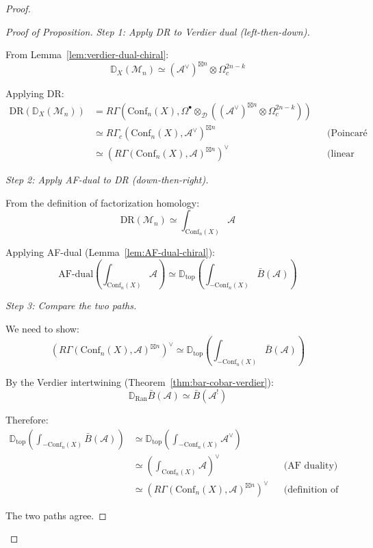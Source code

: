 \begin{proof}
\begin{proof}[Proof of Proposition]
\emph{Step 1: Apply DR to Verdier dual (left-then-down).}

From Lemma~\ref{lem:verdier-dual-chiral}:
\[\mathbb{D}_X(\mathcal{M}_n) \simeq (\mathcal{A}^\vee)^{\boxtimes n} \otimes \Omega^{2n-k}_c\]

Applying DR:
\begin{align*}
\text{DR}(\mathbb{D}_X(\mathcal{M}_n)) 
&= R\Gamma(\text{Conf}_n(X), \Omega^\bullet \otimes_{\mathcal{D}} ((\mathcal{A}^\vee)^{\boxtimes n} \otimes \Omega^{2n-k}_c)) \\
&\simeq R\Gamma_c(\text{Conf}_n(X), \mathcal{A}^\vee)^{\boxtimes n} && \text{(Poincaré duality)} \\
&\simeq \left(R\Gamma(\text{Conf}_n(X), \mathcal{A})^{\boxtimes n}\right)^\vee && \text{(linear duality)}
\end{align*}

\emph{Step 2: Apply AF-dual to DR (down-then-right).}

From the definition of factorization homology:
\[\text{DR}(\mathcal{M}_n) \simeq \int_{\text{Conf}_n(X)} \mathcal{A}\]

Applying AF-dual (Lemma~\ref{lem:AF-dual-chiral}):
\[\text{AF-dual}\left(\int_{\text{Conf}_n(X)} \mathcal{A}\right) \simeq \mathbb{D}_{\text{top}}\left(\int_{-\text{Conf}_n(X)} \bar{B}(\mathcal{A})\right)\]

\emph{Step 3: Compare the two paths.}

We need to show:
\[\left(R\Gamma(\text{Conf}_n(X), \mathcal{A})^{\boxtimes n}\right)^\vee \simeq \mathbb{D}_{\text{top}}\left(\int_{-\text{Conf}_n(X)} \bar{B}(\mathcal{A})\right)\]

By the Verdier intertwining (Theorem~\ref{thm:bar-cobar-verdier}):
\[\mathbb{D}_{\operatorname{Ran}}\bar{B}(\mathcal{A}) \simeq \bar{B}(\mathcal{A}^!)\]

Therefore:
\begin{align*}
\mathbb{D}_{\text{top}}\left(\int_{-\text{Conf}_n(X)} \bar{B}(\mathcal{A})\right)
&\simeq \mathbb{D}_{\text{top}}\left(\int_{-\text{Conf}_n(X)} \mathcal{A}^\vee\right) \\
&\simeq \left(\int_{\text{Conf}_n(X)} \mathcal{A}\right)^\vee && \text{(AF duality)} \\
&\simeq \left(R\Gamma(\text{Conf}_n(X), \mathcal{A})^{\boxtimes n}\right)^\vee && \text{(definition of factorization homology)}
\end{align*}

The two paths agree. \qedhere
\end{proof}


\end{proof}
